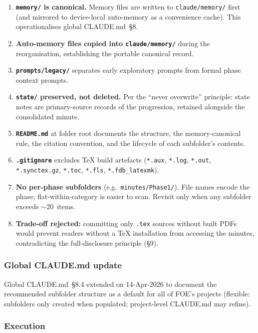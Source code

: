 \documentclass[11pt,a4paper]{article}
\begin{document}
\begin{enumerate}
    \item \textbf{\texttt{memory/} is canonical.} Memory files are written to \texttt{claude/memory/} first (and mirrored to device-local auto-memory as a convenience cache). This operationalises global CLAUDE.md~§8.
    \item \textbf{Auto-memory files copied into \texttt{claude/memory/}} during the reorganisation, establishing the portable canonical record.
    \item \textbf{\texttt{prompts/legacy/}} separates early exploratory prompts from formal phase context prompts.
    \item \textbf{\texttt{state/} preserved, not deleted.} Per the ``never overwrite'' principle: state notes are primary-source records of the progression, retained alongside the consolidated minute.
    \item \textbf{\texttt{README.md}} at folder root documents the structure, the memory-canonical rule, the citation convention, and the lifecycle of each subfolder's contents.
    \item \textbf{\texttt{.gitignore}} excludes TeX build artefacts (\texttt{*.aux}, \texttt{*.log}, \texttt{*.out}, \texttt{*.synctex.gz}, \texttt{*.toc}, \texttt{*.fls}, \texttt{*.fdb\_latexmk}).
    \item \textbf{No per-phase subfolders} (e.g.\ \texttt{minutes/Phase1/}). File names encode the phase; flat-within-category is easier to scan. Revisit only when any subfolder exceeds $\sim$20~items.
    \item \textbf{Trade-off rejected:} committing only \texttt{.tex} sources without built PDFs would prevent readers without a TeX installation from accessing the minutes, contradicting the full-disclosure principle (§9).
\end{enumerate}

\subsubsection{Global CLAUDE.md update}

Global CLAUDE.md~§8.4 extended on 14-Apr-2026 to document the recommended subfolder structure as a default for all of FOE's projects (flexible: subfolders only created when populated; project-level CLAUDE.md may refine).

\subsubsection{Execution}
\end{document}
